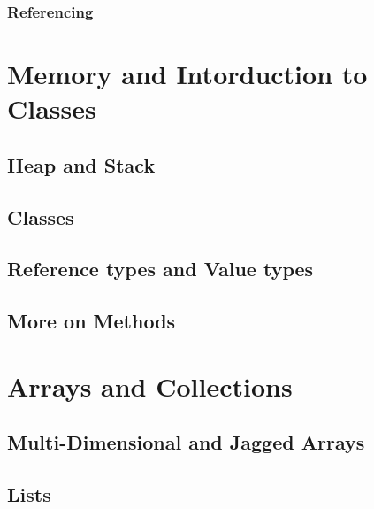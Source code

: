 \documentclass[
]{book}
\begin{document}
\hypertarget{referencing}{%
\subsection{Referencing}\label{referencing}}

\hypertarget{memory-and-intorduction-to-classes}{%
\chapter{Memory and Intorduction to Classes}\label{memory-and-intorduction-to-classes}}

\hypertarget{heap-and-stack}{%
\section{Heap and Stack}\label{heap-and-stack}}

\hypertarget{classes}{%
\section{Classes}\label{classes}}

\hypertarget{reference-types-and-value-types}{%
\section{Reference types and Value types}\label{reference-types-and-value-types}}

\hypertarget{more-on-methods}{%
\section{More on Methods}\label{more-on-methods}}

\hypertarget{arrays-and-collections}{%
\chapter{Arrays and Collections}\label{arrays-and-collections}}

\hypertarget{multi-dimensional-and-jagged-arrays}{%
\section{Multi-Dimensional and Jagged Arrays}\label{multi-dimensional-and-jagged-arrays}}

\hypertarget{lists}{%
\section{Lists}\label{lists}}
\end{document}
